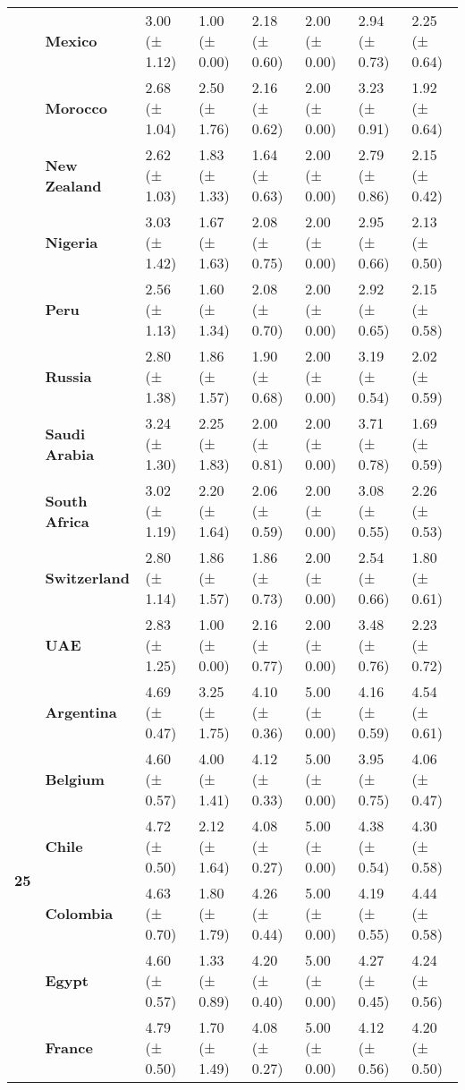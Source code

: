 \begin{tabular}{llllllll}
\textbf{} & \textbf{Mexico} & 3.00 (± 1.12) & 1.00 (± 0.00) & 2.18 (± 0.60) & 2.00 (± 0.00) & 2.94 (± 0.73) & 2.25 (± 0.64) \\
\textbf{} & \textbf{Morocco} & 2.68 (± 1.04) & 2.50 (± 1.76) & 2.16 (± 0.62) & 2.00 (± 0.00) & 3.23 (± 0.91) & 1.92 (± 0.64) \\
\textbf{} & \textbf{New Zealand} & 2.62 (± 1.03) & 1.83 (± 1.33) & 1.64 (± 0.63) & 2.00 (± 0.00) & 2.79 (± 0.86) & 2.15 (± 0.42) \\
\textbf{} & \textbf{Nigeria} & 3.03 (± 1.42) & 1.67 (± 1.63) & 2.08 (± 0.75) & 2.00 (± 0.00) & 2.95 (± 0.66) & 2.13 (± 0.50) \\
\textbf{} & \textbf{Peru} & 2.56 (± 1.13) & 1.60 (± 1.34) & 2.08 (± 0.70) & 2.00 (± 0.00) & 2.92 (± 0.65) & 2.15 (± 0.58) \\
\textbf{} & \textbf{Russia} & 2.80 (± 1.38) & 1.86 (± 1.57) & 1.90 (± 0.68) & 2.00 (± 0.00) & 3.19 (± 0.54) & 2.02 (± 0.59) \\
\textbf{} & \textbf{Saudi Arabia} & 3.24 (± 1.30) & 2.25 (± 1.83) & 2.00 (± 0.81) & 2.00 (± 0.00) & 3.71 (± 0.78) & 1.69 (± 0.59) \\
\textbf{} & \textbf{South Africa} & 3.02 (± 1.19) & 2.20 (± 1.64) & 2.06 (± 0.59) & 2.00 (± 0.00) & 3.08 (± 0.55) & 2.26 (± 0.53) \\
\textbf{} & \textbf{Switzerland} & 2.80 (± 1.14) & 1.86 (± 1.57) & 1.86 (± 0.73) & 2.00 (± 0.00) & 2.54 (± 0.66) & 1.80 (± 0.61) \\
\textbf{} & \textbf{UAE} & 2.83 (± 1.25) & 1.00 (± 0.00) & 2.16 (± 0.77) & 2.00 (± 0.00) & 3.48 (± 0.76) & 2.23 (± 0.72) \\
\cline{1-8}
\multirow[t]{19}{*}{\textbf{25}} & \textbf{Argentina} & 4.69 (± 0.47) & 3.25 (± 1.75) & 4.10 (± 0.36) & 5.00 (± 0.00) & 4.16 (± 0.59) & 4.54 (± 0.61) \\
\textbf{} & \textbf{Belgium} & 4.60 (± 0.57) & 4.00 (± 1.41) & 4.12 (± 0.33) & 5.00 (± 0.00) & 3.95 (± 0.75) & 4.06 (± 0.47) \\
\textbf{} & \textbf{Chile} & 4.72 (± 0.50) & 2.12 (± 1.64) & 4.08 (± 0.27) & 5.00 (± 0.00) & 4.38 (± 0.54) & 4.30 (± 0.58) \\
\textbf{} & \textbf{Colombia} & 4.63 (± 0.70) & 1.80 (± 1.79) & 4.26 (± 0.44) & 5.00 (± 0.00) & 4.19 (± 0.55) & 4.44 (± 0.58) \\
\textbf{} & \textbf{Egypt} & 4.60 (± 0.57) & 1.33 (± 0.89) & 4.20 (± 0.40) & 5.00 (± 0.00) & 4.27 (± 0.45) & 4.24 (± 0.56) \\
\textbf{} & \textbf{France} & 4.79 (± 0.50) & 1.70 (± 1.49) & 4.08 (± 0.27) & 5.00 (± 0.00) & 4.12 (± 0.56) & 4.20 (± 0.50) \\

\end{tabular}
